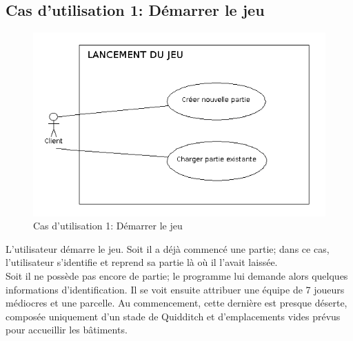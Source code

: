 \documentclass[a4paper,titlepage]{scrreprt}
\begin{document}
  \subsection{Cas d'utilisation 1: Démarrer le jeu}
  \begin{figure}[H]
    \center
    \includegraphics[scale=0.5]{uml/useCaseView/Lancementdujeu.png}
    \caption{Cas d'utilisation 1: Démarrer le jeu}
  \end{figure}  
    L'utilisateur démarre le jeu. Soit il a déjà commencé une \gls{partie}; dans ce cas, l'utilisateur s'identifie et reprend sa partie là où il l'avait laissée. \\
    Soit il ne possède pas encore de partie; le programme lui demande alors quelques informations d'identification. 
    Il se voit ensuite attribuer une équipe de 7 \gls{joueur}s médiocres et une \gls{parcelle}. 
    Au commencement, cette dernière est presque déserte, composée uniquement d'un 
    \gls{stade} de \gls{Quidditch} et d'emplacements vides prévus pour accueillir les bâtiments.
\end{document}
